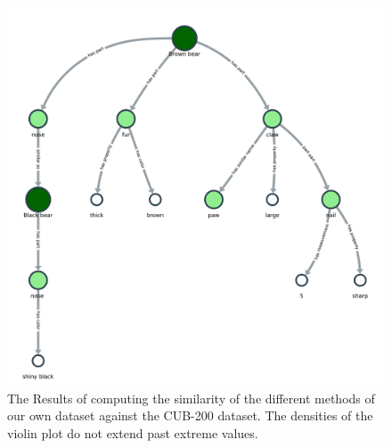 \documentclass[a4paper, 12pt, oneside]{book} %
\begin{document}
\begin{figure}[h!]
 \centering
 \includegraphics[width=\textwidth]{figures/kngraph_rec.pdf}
 \caption[Knowledge Graph Future Example]{The Results of computing the similarity of the different methods of our own dataset against the CUB-200 dataset. The densities of the violin plot do not extend past extreme values.}
 \label{fig:kngraph_rec}
\end{figure}


\printbibliography
\end{document}
